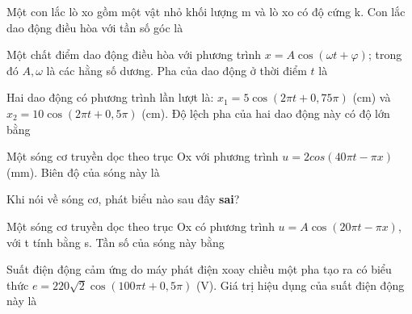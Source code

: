 \documentclass[11pt]{article}
\begin{document}
\setlength{\baselineskip}{12truept}
 \begin{vnmultiplechoice}[ rearrange=yes, keycolumns=3]%

\begin{question} %
Một con lắc lò xo gồm một vật nhỏ khối lượng m và lò xo có độ cứng k. Con lắc dao
động điều hòa với tần số góc là
\datcot
\bonpa
{}
{}
{}
{}
\end{question}

\begin{question} %
Một chất điểm dao động điều hòa với phương trình $x=A\cos(\omega t+\varphi)$; trong đó $A, \omega$ là
các hằng số dương. Pha của dao động ở thời điểm $t$ là
\datcot
\bonpa
{}
{}
{}
{}
\end{question}


\begin{question} %
Hai dao động có phương trình lần lượt là: $x_1=5\cos(2\pi t+0,75\pi)$ (cm) và $x_2=10\cos(2\pi t+0,5\pi)$ (cm).
Độ lệch pha của hai dao động này có độ lớn bằng
\datcot
\bonpa
{}
{}
{}
{}
\end{question}

\begin{question} %
Một sóng cơ truyền dọc theo trục Ox với phương trình $u = 2cos(40\pi t - \pi x)$ (mm). Biên
độ của sóng này là
\datcot
\bonpa
{}
{}
{}
{}
\end{question}

\begin{question} %
 Khi nói về sóng cơ, phát biểu nào sau đây \textbf{sai}?
\datcot[2]
\bonpa
{}
{}
{}
{}
\end{question}

\begin{question} %
Một sóng cơ truyền dọc theo trục Ox có phương trình $u = A\cos(20\pi t - \pi x)$, với t tính bằng s.
Tần số của sóng này bằng
\datcot
\bonpa
{}
{}
{}
{}
\end{question}

\begin{question} %
Suất điện động cảm ứng do máy phát điện xoay chiều một pha tạo ra có biểu thức
$e=220\sqrt2\cos(100\pi t+0,5\pi)$ (V). Giá trị hiệu dụng của suất điện động này là
\datcot
\bonpa
{}
{}
{}
{}
\end{question}


\end{vnmultiplechoice}
\end{document}
